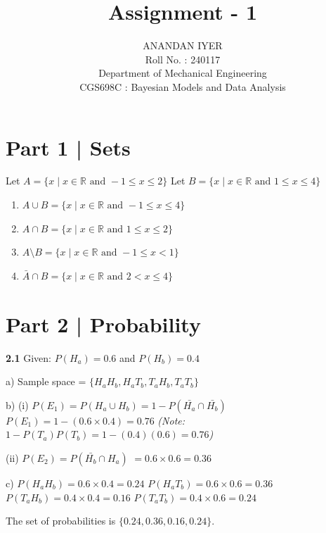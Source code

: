 \documentclass[12pt, letterpaper]{article}
\title{Assignment - 1}
\author{ANANDAN IYER \\ Roll No. : 240117 \\ Department of Mechanical Engineering \\ CGS698C : Bayesian Models and Data Analysis}
\begin{document}
\maketitle

\section*{Part 1 | Sets}

Let $A = \{ x \mid x \in \mathbb{R} \text{ and } -1 \le x \le 2 \}$
\newline
Let $B = \{ x \mid x \in \mathbb{R} \text{ and } 1\le x \le 4 \}$

\begin{enumerate}[label=\alph*)]
    \item $A \cup B = \{ x \mid x \in \mathbb{R} \text{ and } -1 \le x \le 4 \}$
    \item $A \cap B = \{ x \mid x \in \mathbb{R} \text{ and } 1 \le x \le 2 \}$
    \item $A \setminus B = \{ x \mid x \in \mathbb{R} \text{ and } -1 \le x < 1 \}$
    \item $\bar{A} \cap B = \{ x \mid x \in \mathbb{R} \text{ and } 2 < x \le 4 \}$
\end{enumerate}

\section*{Part 2 | Probability}

\textbf{2.1}
Given: $P(H_a) = 0.6$ and $P(H_b) = 0.4$

a) Sample space = $\{ H_aH_b, H_aT_b, T_aH_b, T_aT_b \}$

b) (i) $P(E_1) = P(H_a \cup H_b) = 1 - P(\bar{H_a} \cap \bar{H_b})$
\newline
$P(E_1) = 1 - (0.6 \times 0.4) = 0.76$ 
\newline
\textit{(Note: $1 - P(T_a)P(T_b) = 1 - (0.4)(0.6) = 0.76$)}

(ii) $P(E_2) = P(\bar{H_b} \cap H_a)$
\newline
$= 0.6 \times 0.6 = 0.36$

c) 
$P(H_aH_b) = 0.6 \times 0.4 = 0.24$
\newline
$P(H_aT_b) = 0.6 \times 0.6 = 0.36$
\newline
$P(T_aH_b) = 0.4 \times 0.4 = 0.16$
\newline
$P(T_aT_b) = 0.4 \times 0.6 = 0.24$

The set of probabilities is $\{ 0.24, 0.36, 0.16, 0.24 \}$.
\end{document}
